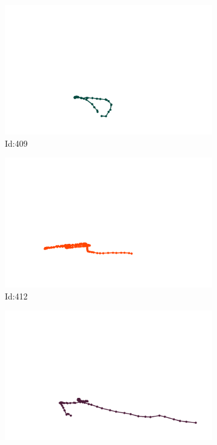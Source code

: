 \documentclass[12pt,twoside]{report}
\begin{document}
\begin{figure}
\centering
\begin{subfigure}[b]{0.20\textwidth}
\centering
\includegraphics[width=\textwidth]{../../trajectories/409.png}
\caption{Id:409}
\end{subfigure}
\begin{subfigure}[b]{0.20\textwidth}
\centering
\includegraphics[width=\textwidth]{../../trajectories/412.png}
\caption{Id:412}
\end{subfigure}
\begin{subfigure}[b]{0.20\textwidth}
\centering
\includegraphics[width=\textwidth]{../../trajectories/620.png}

\end{subfigure}
\end{figure}
\end{document}
